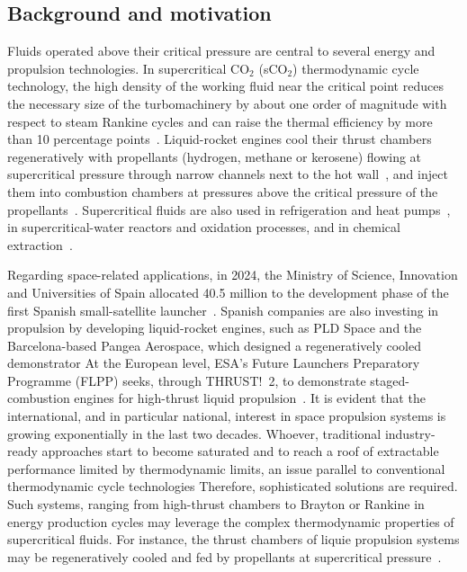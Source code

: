 \documentclass[11pt]{article}
\begin{document}
\subsection{Background and motivation}\label{sec:background}

Fluids operated above their critical pressure are central to several energy and propulsion technologies. 
In supercritical CO$_2$ (sCO$_2$) thermodynamic cycle technology, the high density of the working fluid near the critical point reduces the necessary size of the turbomachinery by about one order of magnitude with respect to steam Rankine cycles and can raise the thermal efficiency by more than 10 percentage points~\cite{Li2025,Ahn2015}. 
Liquid-rocket engines cool their thrust chambers regeneratively with propellants (hydrogen, methane or kerosene) flowing at supercritical pressure through narrow channels next to the hot wall~\cite{Pizzarelli2018,Nasuti2021}, and inject them into combustion chambers at pressures above the critical pressure of the propellants~\cite{JofreUrzay2021,Bellan2020}. 
Supercritical fluids are also used in refrigeration and heat pumps~\cite{Nieuwenhuyse2023}, in supercritical-water reactors and oxidation processes, and in chemical extraction~\cite{Brunner2010,Yoo2013}.

Regarding space-related applications, in 2024, the Ministry of Science, Innovation and Universities of Spain %
allocated \texteuro{}40.5 million to the development
phase of the first Spanish small-satellite launcher~\cite{CDTI2024}. Spanish companies are also investing in propulsion by developing liquid-rocket engines, such as PLD Space and the Barcelona-based Pangea Aerospace, which designed a regeneratively cooled demonstrator
At the European level, ESA's Future Launchers Preparatory Programme (FLPP) seeks, through THRUST!~2, to demonstrate staged-combustion engines for high-thrust liquid propulsion~\cite{ESA2026}.%
It is evident that the international, and in particular national, interest in space propulsion systems is growing exponentially in the last two decades. 
Whoever, traditional industry-ready approaches start to become saturated and to reach a roof of extractable performance limited by thermodynamic limits, an issue parallel to conventional thermodynamic cycle technologies
Therefore, sophisticated solutions are required.
Such systems, ranging from high-thrust chambers to Brayton or Rankine in energy production cycles may leverage the complex thermodynamic properties of supercritical fluids.
For instance, the thrust chambers of liquie propulsion systems may be regeneratively cooled and fed by propellants at supercritical pressure~\cite{Pizzarelli2018}. %
\end{document}
